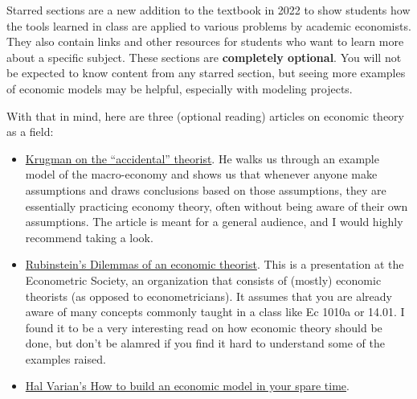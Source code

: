 Starred sections are a new addition to the textbook in 2022 to show students how the tools learned in class are applied to various problems by academic economists. They also contain links and other resources for students who want to learn more about a specific subject. These sections are \textbf{completely optional}. You will not be expected to know content from any starred section, but seeing more examples of economic models may be helpful, especially with modeling projects. 

With that in mind, here are three (optional reading) articles on economic theory as a field:
\begin{itemize}
    \item \href{https://slate.com/business/1997/01/the-accidental-theorist.html}{Krugman on the ``accidental'' theorist}. He walks us through an example model of the macro-economy and shows us that whenever anyone make assumptions and draws conclusions based on those assumptions, they are essentially practicing economy theory, often without being aware of their own assumptions. The article is meant for a general audience, and I would highly recommend taking a look.
    \item \href{https://www.jstor.org/stable/3805911}{Rubinstein's Dilemmas of an economic theorist}. This is a presentation at the Econometric Society, an organization that consists of (mostly) economic theorists (as opposed to econometricians). It assumes that you are already aware of many concepts commonly taught in a class like Ec 1010a or 14.01. I found it to be a very interesting read on how economic theory should be done, but don't be alamred if you find it hard to understand some of the examples raised. 
    \item \href{https://www.jstor.org/stable/25604102}{Hal Varian's How to build an economic model in your spare time}. 
\end{itemize}

